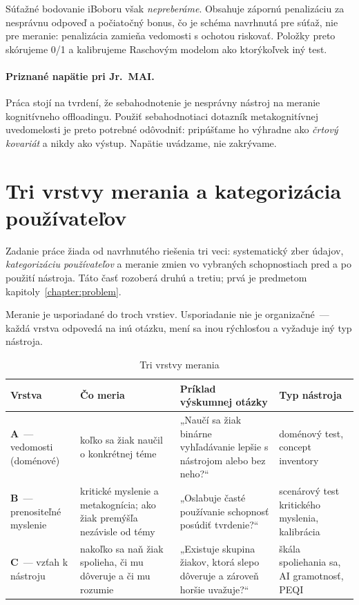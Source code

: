 Súťažné bodovanie iBoboru však \emph{nepreberáme}. Obsahuje zápornú penalizáciu za nesprávnu odpoveď a počiatočný bonus, čo je schéma navrhnutá pre súťaž, nie pre meranie: penalizácia zamieňa vedomosti s ochotou riskovať. Položky preto skórujeme 0/1 a kalibrujeme Raschovým modelom ako ktorýkoľvek iný test.

\paragraph{Priznané napätie pri Jr.~MAI.} Práca stojí na tvrdení, že sebahodnotenie je nesprávny nástroj na meranie kognitívneho offloadingu. Použiť sebahodnotiaci dotazník metakognitívnej uvedomelosti je preto potrebné odôvodniť: pripúšťame ho výhradne ako \emph{črtový kovariát} a nikdy ako výstup. Napätie uvádzame, nie zakrývame.


\section{Tri vrstvy merania a kategorizácia používateľov}
\label{sec:tri-vrstvy}

Zadanie práce žiada od navrhnutého riešenia tri veci: systematický zber údajov, \emph{kategorizáciu používateľov} a meranie zmien vo vybraných schopnostiach pred a po použití nástroja. Táto časť rozoberá druhú a tretiu; prvá je predmetom kapitoly~\ref{chapter:problem}.

Meranie je usporiadané do troch vrstiev. Usporiadanie nie je organizačné~--- každá vrstva odpovedá na inú otázku, mení sa inou rýchlosťou a vyžaduje iný typ nástroja.

\begin{table}[H]
\centering
\caption{Tri vrstvy merania}
\label{tab:vrstvy}
\small
\begin{tabularx}{\textwidth}{@{}l X X l@{}}
\toprule
\textbf{Vrstva} & \textbf{Čo meria} & \textbf{Príklad výskumnej otázky} & \textbf{Typ nástroja} \\
\midrule
\textbf{A}~--- vedomosti (doménové) & koľko sa žiak naučil o konkrétnej téme & „Naučí sa žiak binárne vyhľadávanie lepšie s nástrojom alebo bez neho?“ & doménový test, concept inventory \\
\textbf{B}~--- prenositeľné myslenie & kritické myslenie a metakognícia; ako žiak premýšľa nezávisle od témy & „Oslabuje časté používanie schopnosť posúdiť tvrdenie?“ & scenárový test kritického myslenia, kalibrácia \\
\textbf{C}~--- vzťah k nástroju & nakoľko sa naň žiak spolieha, či mu dôveruje a či mu rozumie & „Existuje skupina žiakov, ktorá slepo dôveruje a zároveň horšie uvažuje?“ & škála spoliehania sa, AI gramotnosť, PEQI \\
\bottomrule
\end{tabularx}
\end{table}

